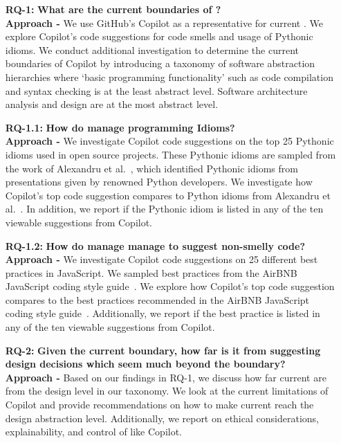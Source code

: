\begin{enumerate}
  \item[\textbf{RQ-1: }]
  \textbf{What are the current boundaries of \cct{}?} \\
  \textbf{Approach -} We use GitHub's Copilot as a representative for current \cct{}. We explore Copilot's code suggestions for code smells and usage of Pythonic idioms. We conduct additional investigation to determine the current boundaries of Copilot by introducing a taxonomy of software abstraction hierarchies where ‘basic programming functionality’ such as code compilation and syntax checking is at the least abstract level. Software architecture analysis and design are at the most abstract level. 
  
  \item[\textbf{RQ-1.1: }]
  \textbf{How do \cct{} manage programming Idioms?} \\
  \textbf{Approach -} We investigate Copilot code suggestions on the top 25 Pythonic idioms used in open source projects. These Pythonic idioms are sampled from the work of Alexandru et al.~\cite{Alexandru2018}, which identified Pythonic idioms from presentations given by renowned Python developers. We investigate how Copilot's top code suggestion compares to Python idioms from Alexandru et al.~\cite{Alexandru2018}. In addition, we report if the Pythonic idiom is listed in any of the ten viewable suggestions from Copilot.
  
  \item[\textbf{RQ-1.2: }]
  \textbf{How do \cct{} manage manage to suggest non-smelly code?} \\
\textbf{Approach -} We investigate Copilot code suggestions on 25 different best practices in JavaScript. We sampled best practices from the AirBNB JavaScript coding style guide~\cite{airbnb_code}. We explore how Copilot's top code suggestion compares to the best practices recommended in the AirBNB JavaScript coding style guide~\cite{airbnb_code}. Additionally, we report if the best practice is listed in any of the ten viewable suggestions from Copilot. 
 
  \item[\textbf{RQ-2: }]
  \textbf{Given the current boundary, how far is it from suggesting design decisions which seem much beyond the boundary?} \\
  \textbf{Approach -} Based on our findings in RQ-1, we discuss how far current \cct{} are from the design level in our taxonomy. We look at the current limitations of Copilot and provide recommendations on how to make current \cct{} reach the design abstraction level. Additionally, we report on ethical considerations, explainability, and control of \cct{} like Copilot. 
\end{enumerate}